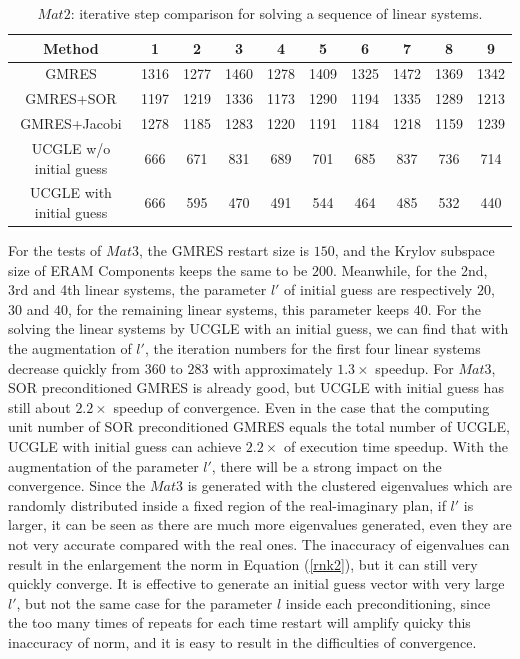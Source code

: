 \begin{table}[htbp]
	\small
	\label{tb3}
	\caption{$Mat2$:  iterative step comparison for solving a sequence of linear systems.}
	\centering
	\renewcommand{\arraystretch}{1.6}
	\begin{tabular}{c*{9}{c}}
		\toprule
		Method              & 1 &  2 &  3 &  4 &  5  &  6  & 7 & 8 & 9\\
		\hline
		GMRES & 1316	&1277	&1460	&1278	&1409	&1325	&1472	&1369	&1342\\
		GMRES+SOR            & 1197&	1219&	1336&	1173	&1290	&1194	&1335	&1289	&1213\\
		GMRES+Jacobi            & 1278&	1185	&1283&	1220	&1191&	1184	&1218&	1159&	1239\\
		UCGLE w/o initial guess     & 666	&671	&831	&689	&701	&685	&837	&736	&714\\
		UCGLE with initial guess     & 666	&595	&470	&491	&544	&464	&485	&532	&440\\
		\hline
	\end{tabular}
\end{table}

For the tests of $Mat3$, the GMRES restart size is $150$, and the Krylov subspace size of ERAM Components keeps the same to be $200$. Meanwhile, for the 2nd, 3rd and 4th linear systems, the parameter $l'$ of initial guess are respectively $20$, $30$ and $40$, for the remaining linear systems, this parameter keeps $40$. For the solving the linear systems by UCGLE with an initial guess, we can find that with the augmentation of $l'$, the iteration numbers for the first four linear systems decrease quickly from $360$ to $283$ with approximately $1.3 \times$ speedup. For $Mat3$, SOR preconditioned GMRES is already good, but UCGLE with initial guess has still about $2.2 \times$ speedup of convergence. Even in the case that the computing unit number of SOR preconditioned GMRES equals the total number of UCGLE, UCGLE with initial guess can achieve $2.2 \times$ of execution time speedup. With the augmentation of the parameter $l'$, there will be a strong impact on the convergence. Since the $Mat3$ is generated with the clustered eigenvalues which are randomly distributed inside a fixed region of the real-imaginary plan, if $l'$ is larger, it can be seen as there are much more eigenvalues generated, even they are not very accurate compared with the real ones. The inaccuracy of eigenvalues can result in the enlargement the norm in Equation (\ref{rnk2}), but it can still very quickly converge. It is effective to generate an initial guess vector with very large $l'$, but not the same case for the parameter $l$ inside each preconditioning, since the too many times of repeats for each time restart will amplify quicky this inaccuracy of norm, and it is easy to result in the difficulties of convergence.

